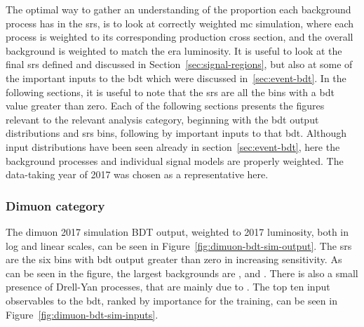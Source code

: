 The optimal way to gather an understanding of the proportion each background process has in the \glspl{sr}, is to look at correctly weighted \gls{mc} simulation,  where each process is weighted to its corresponding production cross section, and the overall background is weighted to match the era luminosity. It is useful to look at the final \glspl{sr} defined and discussed in Section~\ref{sec:signal-regions}, but also at some of the important inputs to the \gls{bdt} which were discussed in~\ref{sec:event-bdt}. In the following sections, it is useful to note that the \glspl{sr} are all the bins with a \gls{bdt} value greater than zero.  Each of the following sections presents the figures relevant to the relevant analysis category,  beginning with the \gls{bdt} output distributions and \glspl{sr} bins, following by important inputs to that \gls{bdt}. Although input distributions have been seen already in section~\ref{sec:event-bdt}, here the background processes and individual signal models are properly weighted. The data-taking year of 2017 was chosen as a representative here.

\clearpage
\subsubsection{Dimuon category}
\label{sec:dimuon-category-background-char}

The dimuon 2017 simulation BDT output, weighted to 2017 luminosity, both in log and linear scales, can be seen in Figure~\ref{fig:dimuon-bdt-sim-output}. The \glspl{sr} are the six bins with \gls{bdt} output greater than zero in increasing sensitivity. As can be seen in the figure, the largest backgrounds are \ttbar, \zjets and \wjets. There is also a small presence of Drell-Yan processes, that are mainly due to \ztautau. The top ten input observables to the \gls{bdt}, ranked by importance for the training, can be seen in Figure~\ref{fig:dimuon-bdt-sim-inputs}.

